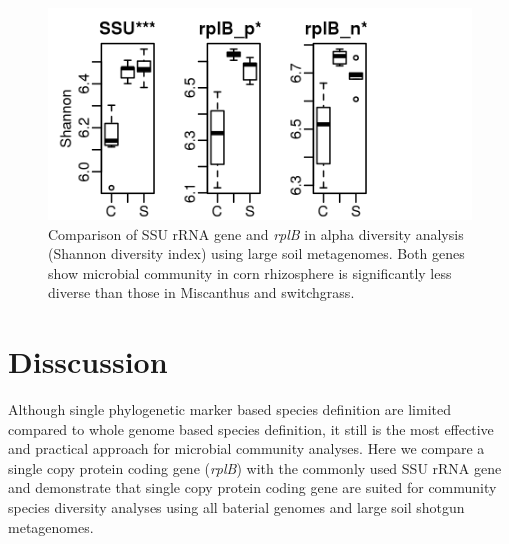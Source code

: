 \documentclass[]{msu-thesis}
\begin{document}
\begin{figure}[tbph!]
  \centering
  \includegraphics[scale=1]{figs/shannon_metag}
  \caption[Comparison of SSU rRNA gene and \textit{rplB} in alpha diversity using large soil metagenomes]{Comparison of SSU rRNA gene and \textit{rplB} in alpha diversity analysis (Shannon diversity index) using large soil metagenomes. Both genes show microbial community in corn rhizosphere is significantly less diverse than those in Miscanthus and switchgrass.}
  \label{fig:shannonMetag}
\end{figure}


\section{Disscussion}

Although single phylogenetic marker based species definition are limited compared to whole genome based species definition, it still is the most effective and practical approach for microbial community analyses. Here we compare a single copy protein coding gene (\textit{rplB}) with the commonly used SSU rRNA gene and demonstrate that single copy protein coding gene are suited for community species diversity analyses using all baterial genomes and large soil shotgun metagenomes.
\end{document}
